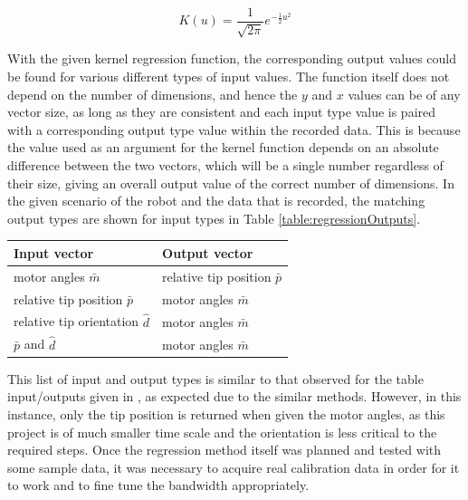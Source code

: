 \documentclass[11pt]{article}
\begin{document}
\begin{equation}\label{equation:Gaussian}
K(u) = \frac{1}{\sqrt{2\pi}}e^{-\frac{1}{2}u^2}
\end{equation}

With the given kernel regression function, the corresponding output values could be found for various different types of input values. The function itself does not depend on the number of dimensions, and hence the $y$ and $x$ values can be of any vector size, as long as they are consistent and each input type value is paired with a corresponding output type value within the recorded data. This is because the value used as an argument for the kernel function depends on an absolute difference between the two vectors, which will be a single number regardless of their size, giving an overall output value of the correct number of dimensions. In the given scenario of the robot and the data that is recorded, the matching output types are shown for input types in Table \ref{table:regressionOutputs}.

\begin{center}
\label{table:regressionOutputs}
\begin{tabularx}{0.66\textwidth}{ | >{\centering\arraybackslash}p{12em} |>{\centering\arraybackslash}X|} 
\hline
Input vector & Output vector\\
\hline
motor angles $\bar{m}$ & relative tip position $\bar{p}$ \\
relative tip position $\bar{p}$ & motor angles $\bar{m}$ \\
relative tip orientation $\hat{d}$ & motor angles $\bar{m}$ \\
$\bar{p}$ and $\hat{d}$ & motor angles $\bar{m}$\\
\hline
\end{tabularx}
\end{center}

This list of input and output types is similar to that observed for the table input/outputs given in \cite{GreggSmithDesign}, as expected due to the similar methods. However, in this instance, only the tip position is returned when given the motor angles, as this project is of much smaller time scale and the orientation is less critical to the required steps. Once the regression method itself was planned and tested with some sample data, it was necessary to acquire real calibration data in order for it to work and to fine tune the bandwidth appropriately.
\end{document}
